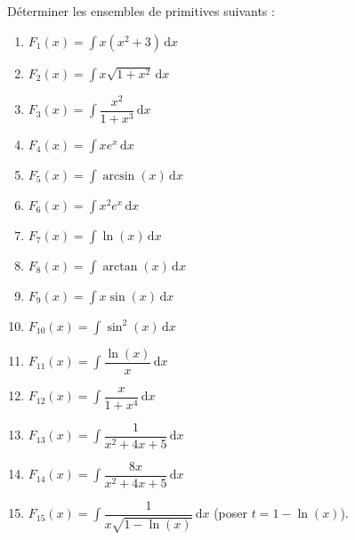 
\begin{exercice}\label{exostarterST-0018}

 
Déterminer les ensembles de  primitives suivants :
\begin{multicols}{3}
  \begin{enumerate}
  \item $F_{1}(x)=\displaystyle\int x(x^2+3) \,\mathrm dx$ 
  \item $F_{2}(x)=\displaystyle\int x\sqrt{1+x^2} \,\mathrm dx$ 
  \item $F_{3}(x)=\displaystyle\int \dfrac{x^2}{1+x^3} \,\mathrm dx$ 
  \item $F_{4}(x)=\displaystyle\int x e^x  \,\mathrm dx$ 
  \item $F_{5}(x)=\displaystyle\int\arcsin (x) \,\mathrm dx$ 
  \item $F_{6}(x)=\displaystyle\int x^2 e^x  \,\mathrm dx$ 
  \item $F_{7}(x)=\displaystyle\int\ln (x) \,\mathrm dx$ 
  \item $F_{8}(x)=\displaystyle\int\arctan (x) \,\mathrm dx$ 
  \item $F_{9}(x)=\displaystyle\int x\sin (x) \,\mathrm dx$  
  \item $F_{10}(x)=\displaystyle\int\sin^2 (x)\,\mathrm dx$  
  \item $F_{11}(x)=\displaystyle\int\dfrac{\ln(x)}{x}\,\mathrm dx$
  \item $F_{12}(x)=\displaystyle\int\dfrac{x}{1+x^4}\,\mathrm dx$ 
  \item $F_{13}(x)=\displaystyle\int\dfrac{1}{x^2+4x+5}\,\mathrm dx$
  \item $F_{14}(x)=\displaystyle\int\dfrac{8x}{x^2+4x+5}\,\mathrm dx$
  \item $F_{15}(x)=\displaystyle\int \dfrac{1}{x\sqrt{1-\ln (x)}}\,\mathrm dx$  (poser $t=1-\ln(x)$).



  \end{enumerate}
\end{multicols}


\end{exercice}
